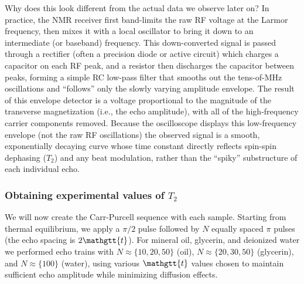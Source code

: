 \documentclass[
    floatfix,  %
    reprint,
    amsmath,
    amssymb,
    aps,
]{revtex4-2}
\newcommand{\taucode}{\mathgtt{t}}
\begin{document}


Why does this look different from the actual data we observe later on? In practice, the NMR receiver first band-limits the raw RF voltage at the Larmor frequency, then mixes it with a local oscillator to bring it down to an intermediate (or baseband) frequency. This down-converted signal is passed through a rectifier (often a precision diode or active circuit) which charges a capacitor on each RF peak, and a resistor then discharges the capacitor between peaks, forming a simple RC low-pass filter that smooths out the tens-of-MHz oscillations and ``follows'' only the slowly varying amplitude envelope. The result of this envelope detector is a voltage proportional to the magnitude of the transverse magnetization (i.e., the echo amplitude), with all of the high-frequency carrier components removed. Because the oscilloscope displays this low-frequency envelope (not the raw RF oscillations) the observed signal is a smooth, exponentially decaying curve whose time constant directly reflects spin-spin dephasing ($T_2$) and any beat modulation, rather than the ``spiky'' substructure of each individual echo.







\subsubsection{Obtaining experimental values of $T_2$}

We will now create the Carr-Purcell sequence with each sample. Starting from thermal equilibrium, we apply a $\pi/2$ pulse followed by $N$ equally spaced $\pi$ pulses (the echo spacing is $2\taucode$). For mineral oil, glycerin, and deionized water we performed echo trains with $N\approx\{10,20,50\}$ (oil), $N\approx\{20,30,50\}$ (glycerin), and $N\approx\{100\}$ (water), using various $\taucode$ values chosen to maintain sufficient echo amplitude while minimizing diffusion effects.
\end{document}
